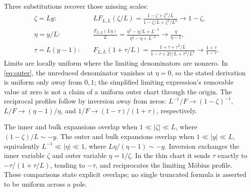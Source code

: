 Three substitutions recover those missing scales:
\begin{align}
\zeta=Ly:&\quad
L F_{L,L}(\zeta/L)
=\frac{1-\zeta+\zeta^2/L}{1-\zeta/L+\zeta^2/L^3}
\longrightarrow1-\zeta,\label{eq:inner}\\
\eta=y/L:&\quad
\frac{F_{L,L}(L\eta)}L
=\frac{\eta^2-\eta/L+L^{-3}}{\eta^2-\eta+L^{-1}}
\longrightarrow\frac{\eta}{\eta-1},\label{eq:outer}\\
\tau=L(y-1):&\quad
F_{L,L}(1+\tau/L)
=\frac{1+\tau+\tau^2/L}{1-\tau+2\tau/L+\tau^2/L^2}
\longrightarrow\frac{1+\tau}{1-\tau}.\label{eq:thin}
\end{align}
Limits are locally uniform where the limiting denominators are nonzero. In \eqref{eq:outer}, the unreduced denominator vanishes at \(\eta=0\), so the stated derivation is uniform only away from \(0,1\); the simplified limiting expression's removable value at zero is not a claim of a uniform outer chart through the origin. The reciprocal profiles follow by inversion away from zeros: \(L^{-1}/F\to(1-\zeta)^{-1}\), \(L/F\to(\eta-1)/\eta\), and \(1/F\to(1-\tau)/(1+\tau)\), respectively.

The inner and bulk expansions overlap when \(1\ll|\zeta|\ll L\), where \((1-\zeta)/L\sim-y\). The outer and bulk expansions overlap when \(1\ll|y|\ll L\), equivalently \(L^{-1}\ll|\eta|\ll1\), where \(L\eta/(\eta-1)\sim-y\). Inversion exchanges the inner variable \(\zeta\) and outer variable \(\eta=1/\zeta\). In the thin chart it sends \(\tau\) exactly to \(-\tau/(1+\tau/L)\), tending to \(-\tau\), and reciprocates the limiting Möbius profile. These comparisons state explicit overlaps; no single truncated formula is asserted to be uniform across a pole.

